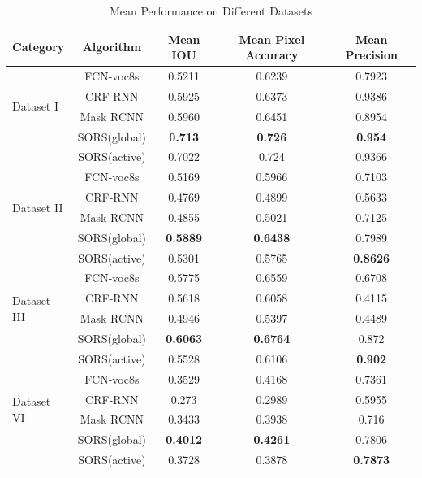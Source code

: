 \documentclass[conference]{IEEEtran}
\begin{document}
 \begin{table}[htbp]
	\centering
	\normalsize
	\caption{ Mean Performance on Different Datasets }
	\label{t6}
	\begin{tabular}{lcccc}
		\hline
		Category& Algorithm& Mean IOU& Mean Pixel Accuracy& Mean Precision \\
		\hline
		\multirow {4}{3cm}{Dataset I}&FCN-voc8s&0.5211&0.6239&0.7923\\
		
		&CRF-RNN&0.5925&0.6373&0.9386\\
		&{\color{blue}Mask RCNN}&{\color{blue}0.5960}&{\color{blue} 0.6451} &{\color{blue} 0.8954}  \\
		
		&SORS(global)&\textbf{0.713}&\textbf{0.726}&\textbf{0.954}\\
		
		&SORS(active)&0.7022&0.724&0.9366\\
		\cline{1-5}
		\multirow {4}{3cm}{Dataset II}&FCN-voc8s&0.5169&0.5966&0.7103\\
		
		&CRF-RNN&0.4769&0.4899&0.5633\\
		&{\color{blue}Mask RCNN}&{\color{blue}0.4855}&{\color{blue} 0.5021} &{\color{blue} 0.7125}  \\
		
		&SORS(global)&\textbf{0.5889}&\textbf{0.6438}&0.7989\\
		
		&SORS(active)&0.5301&0.5765&\textbf{0.8626}\\
		\cline{1-5}
		\multirow {4}{3cm}{Dataset III}&FCN-voc8s&0.5775&0.6559&0.6708\\
		
		&CRF-RNN&0.5618&0.6058&0.4115\\
		&{\color{blue}Mask RCNN}&{\color{blue}0.4946}&{\color{blue} 0.5397} &{\color{blue} 0.4489}  \\
		
		&SORS(global)&\textbf{0.6063}&\textbf{0.6764}&0.872\\
		
		&SORS(active)&0.5528&0.6106&\textbf{0.902}\\
		\cline{1-5}
		\multirow {4}{3cm}{Dataset VI}&FCN-voc8s&0.3529&0.4168&0.7361\\
		
		&CRF-RNN&0.273&0.2989&0.5955\\
		&{\color{blue}Mask RCNN}&{\color{blue}0.3433}&{\color{blue} 0.3938} &{\color{blue} 0.716}  \\
		
		&SORS(global)&\textbf{0.4012}&\textbf{0.4261}&0.7806\\
		
		&SORS(active)&0.3728&0.3878&\textbf{0.7873}\\
		\cline{1-5}
	\end{tabular}	
\end{table}
\end{document}
